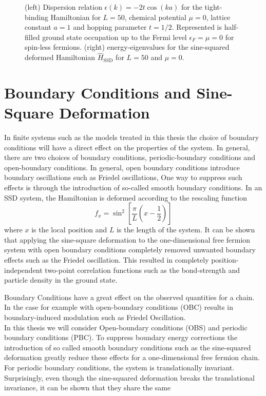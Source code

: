 \documentclass[11pt, a4paper]{article}
\theoremstyle{definition} %
\begin{document}
\begin{figure}[h]
\begin{subfigure}[t]{0.49\textwidth}
\end{subfigure}
\caption{(left) Dispersion relation $\epsilon(k) = -2t\cos(ka)$ for the tight-binding Hamiltonian for $L=50$, chemical potential $\mu = 0$, lattice constant $a = 1$ and hopping parameter $t = 1/2$. Represented is half-filled ground state occupation up to the Fermi level $\epsilon_F = \mu =0$ for spin-less fermions. (right) energy-eigenvalues for the sine-squared deformed Hamiltonian $\hat{H}_{\text{SSD}}$ for $L = 50$ and $\mu = 0$.}
\end{figure}




\section{Boundary Conditions and Sine-Square Deformation}
In finite systems such as the models treated in this thesis the choice of boundary conditions will have a direct effect on the properties of the system. In general, there are two choices of boundary conditions, periodic-boundary conditions and open-boundary conditions. In general, open boundary conditions introduce boundary oscillations such as Friedel oscillations, One way to suppress such effects is through the introduction of so-called smooth boundary conditions. In an SSD system, the Hamiltonian is deformed according to the rescaling function
\begin{equation}
	f_x = \sin^2\left[\frac{\pi}{L} \left(x -\frac{1}{2} \right)\right]
	\label{eq:scaling_function_SSD}
\end{equation}
where $x$ is the local position and $L$ is the length of the system. It can be shown that applying the sine-square deformation to the one-dimensional free fermion system with open boundary conditions completely removed unwanted boundary effects such as the Friedel oscillation. This resulted in completely position-independent two-point correlation functions such as the bond-strength and particle density in the ground state. 



Boundary Conditions have a great effect on the observed quantities for a chain. In the case for example with open-boundary conditions (OBC) results in boundary-induced modulation such as Friedel Oscillation. \\

In this thesis we will consider Open-boundary conditions (OBS) and periodic boundary conditions (PBC). To suppress boundary energy corrections the introduction of so called smooth boundary conditions such as the sine-squared deformation greatly reduce these effects for a one-dimensional free fermion chain. For periodic boundary conditions, the system is translationally invariant. Surprisingly, even though the sine-squared deformation breaks the translational invariance, it can be shown that they share the same \\
\end{document}
